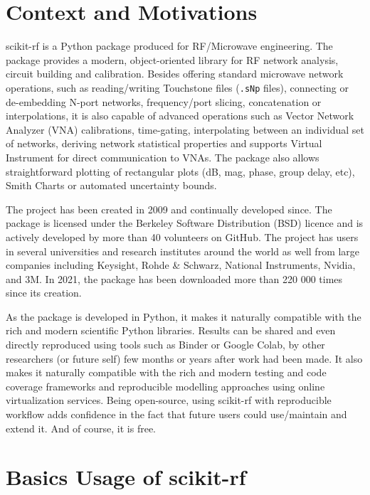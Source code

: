 \documentclass{IEEEjmw}
\begin{document}
\maketitle

\section{Context and Motivations}
scikit-rf is a Python package produced for RF/Microwave engineering. The package provides a modern, object-oriented library for RF network analysis, circuit building and calibration. Besides offering standard microwave network operations, such as reading/writing Touchstone files (\texttt{.sNp} files), connecting or de-embedding N-port networks, frequency/port slicing, concatenation or interpolations, it is also capable of advanced operations such as Vector Network Analyzer (VNA) calibrations, time-gating, interpolating between an individual set of networks, deriving network statistical properties and supports Virtual Instrument for direct communication to VNAs. The package also allows straightforward plotting of rectangular plots (dB, mag, phase, group delay, etc), Smith Charts or automated uncertainty bounds.
 
The project has been created in 2009 and continually developed since. The package is licensed under the Berkeley Software Distribution (BSD) licence and is actively developed by more than 40 volunteers on GitHub. The project has users in several universities and research institutes around the world as well from large companies including Keysight, Rohde \& Schwarz, National Instruments, Nvidia, and 3M. In 2021, the package has been downloaded more than 220 000 times since its creation.

As the package is developed in Python, it makes it naturally compatible with the rich and modern scientific Python libraries. Results can be shared and even directly reproduced using tools such as Binder or Google Colab, by other researchers (or future self) few months or years after work had been made. It also makes it naturally compatible with the rich and modern testing and code coverage frameworks and reproducible modelling approaches using online virtualization services. Being open-source, using scikit-rf with reproducible workflow adds confidence in the fact that future users could use/maintain and extend it. And of course, it is free.

\section{Basics Usage of scikit-rf}
\end{document}
